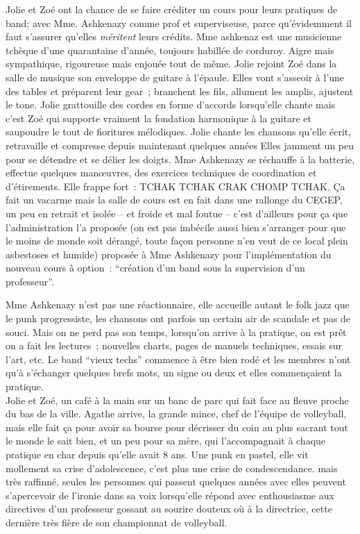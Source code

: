 \documentclass{article}
\begin{document}
Jolie et Zoé ont la chance de se faire créditer un cours pour leurs pratiques
de band; avec Mme. Ashkenazy comme prof et superviseuse, parce qu'évidemment
il faut s'assurer qu'elles \textit{méritent} leurs crédits.
Mme ashkenaz est une musicienne tchèque d’une
quarantaine d’année, toujours habillée de corduroy. Aigre mais sympathique,
rigoureuse mais enjouée tout de même. Jolie rejoint Zoé dans la salle de
musique son enveloppe de guitare à l’épaule. Elles vont s’asseoir à l’une des
tables et préparent leur gear ; branchent les fils, allument les amplis,
ajustent le tone. Jolie grattouille des cordes en forme d’accords lorsqu’elle
chante mais c’est Zoé qui supporte vraiment la fondation harmonique à la
guitare et saupoudre le tout de fioritures mélodiques. Jolie chante les
chansons qu’elle écrit, retravaille et compresse depuis maintenant quelques
années Elles jamment un peu pour se détendre et se délier les doigts. Mme
Ashkenazy se réchauffe à la batterie, effectue quelques manœuvres, des exercices
techniques de coordination et d’étirements.
Elle frappe fort : TCHAK TCHAK CRAK CHOMP TCHAK.
Ça fait un vacarme mais la salle de cours est en fait dans une rallonge du
CEGEP, un peu en retrait et isolée – et froide et mal foutue – c’est
d’ailleurs pour ça que l’administration l’a proposée (on est pas imbécile aussi
bien s’arranger pour que le moins de monde soit dérangé, toute façon personne
n’en veut de ce local plein asbestoses et humide) proposée à Mme Ashkenazy pour
l’implémentation du nouveau cours à option : “création d’un band sous la
supervision d’un professeur”.

Mme Ashkenazy n’est pas une réactionnaire, elle accueille autant le folk jazz
que le punk progressiste, les chansons ont parfois un certain air de scandale
et pas de souci. Mais on ne perd pas son temps, lorsqu’on arrive à la pratique,
on est prêt on a fait les lectures ; nouvelles charts, pages de manuels
techniques, essais sur l’art, etc. Le band “vieux techs” commence à être bien
rodé et les membres n’ont qu’à s’échanger quelques brefs mots, un signe ou deux
et elles commençaient la pratique. \\

Jolie et Zoé, un café à la main sur un banc de parc qui fait face au fleuve
proche du bas de la ville. Agathe arrive, la grande mince, chef de l'équipe
de volleyball, mais elle fait ça pour avoir sa bourse pour décrisser du coin
au plus sacrant tout le monde le sait bien, et un peu pour sa mère, qui
l'accompagnait à chaque pratique en char depuis qu'elle avait 8 ans. Une punk
en pastel, elle vit mollement sa crise d'adolescence, c'est plus une crise
de condescendance. mais très raffinné, seules les personnes qui passent
quelques années avec elles peuvent s'apercevoir de l'ironie dans sa voix
lorsqu'elle répond avec enthousiasme  aux directives d'un professeur gossant
au sourire douteux où à la directrice, cette dernière très fière de son
championnat de volleyball.\\[1ex]
\end{document}

